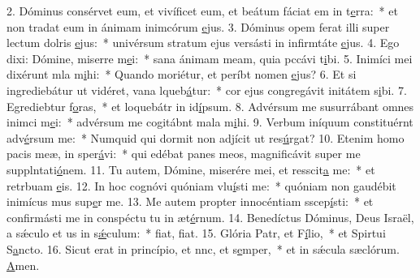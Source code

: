 2. Dóminus consérvet eum, et vivíficet eum, et beátum fáciat em in t\uline{e}rra:~* et non tradat eum in ánimam inimcórum \uline{e}jus.
3. Dóminus opem ferat illi super lectum dolris \uline{e}jus:~* univérsum stratum ejus versásti in infirmtáte \uline{e}jus.
4. Ego dixi: Dómine, miserre m\uline{e}i:~* sana ánimam meam, quia pccávi t\uline{i}bi.
5. Inimíci mei dixérunt mla m\uline{i}hi:~* Quando moriétur, et períbt nomen \uline{e}jus?
6. Et si ingrediebátur ut vidéret, vana lqueb\uline{á}tur:~* cor ejus congregávit initátem s\uline{i}bi.
7. Egrediebtur f\uline{o}ras,~* et loquebátr in id\uline{í}psum.
8. Advérsum me susurrábant omnes inimci m\uline{e}i:~* advérsum me cogitábnt mala m\uline{i}hi.
9. Verbum iníquum constituérnt adv\uline{é}rsum me:~* Numquid qui dormit non adjícit ut res\uline{ú}rgat?
10. Etenim homo pacis meæ, in  sper\uline{á}vi:~* qui edébat panes meos, magnificávit super me supplntati\uline{ó}nem.
11. Tu autem, Dómine, miserére mei, et resscit\uline{a} me:~* et retrbuam \uline{e}is.
12. In hoc cognóvi quóniam vlu\uline{í}sti me:~* quóniam non gaudébit inimícus mus sup\uline{e}r me.
13. Me autem propter innocéntiam sscep\uline{í}sti:~* et confirmásti me in conspéctu tu in æt\uline{é}rnum.
14. Benedíctus Dóminus, Deus Israël, a sǽculo et us in s\uline{ǽ}culum:~* fiat, f\uline{i}at.
15. Glória Patr, et F\uline{í}lio,~* et Spirtui S\uline{a}ncto.
16. Sicut erat in princípio, et nnc, et s\uline{e}mper,~* et in sǽcula sæclórum. \uline{A}men.
